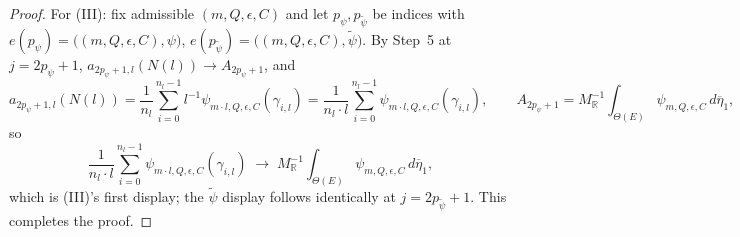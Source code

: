 \begin{proof}
  For (III): fix admissible $(m,Q,\epsilon,C)$ and let $p_\psi,p_{\tilde\psi}$ be indices with
  $e(p_\psi)=\bigl((m,Q,\epsilon,C),\psi\bigr)$, $e(p_{\tilde\psi})=\bigl((m,Q,\epsilon,C),
  \tilde\psi\bigr)$. By Step~5 at $j=2p_\psi+1$, $a_{2p_\psi+1,l}(N(l)) \to A_{2p_\psi+1}$, and
  \[
    a_{2p_\psi+1,l}(N(l)) = \frac1{n_l}\sum_{i=0}^{n_l-1} l^{-1}\psi_{m\cdot
    l,Q,\epsilon,C}(\gamma_{i,l})
    = \frac1{n_l\cdot l}\sum_{i=0}^{n_l-1} \psi_{m\cdot l,Q,\epsilon,C}(\gamma_{i,l})
    ,
    \qquad
    A_{2p_\psi+1} = M_{\mathbb R}^{-1}\int_{\Theta(E)}\psi_{m,Q,\epsilon,C}\,d\overline\eta_1
    ,
  \]
  so
  \[
    \frac1{n_l\cdot l}\sum_{i=0}^{n_l-1} \psi_{m\cdot l,Q,\epsilon,C}(\gamma_{i,l})
    \;\longrightarrow\; M_{\mathbb R}^{-1}\int_{\Theta(E)}\psi_{m,Q,\epsilon,C}\,d\overline\eta_1
    ,
  \]
  which is (III)'s first display; the $\tilde\psi$ display follows identically at
  $j=2p_{\tilde\psi}+1$. This completes the proof.
\end{proof}
